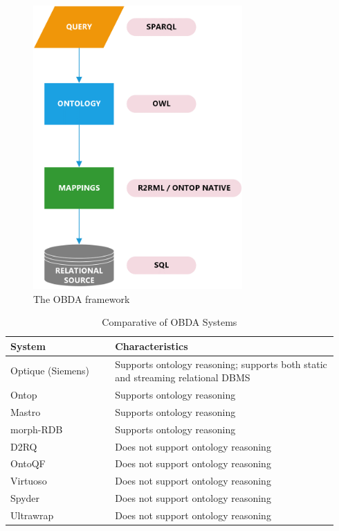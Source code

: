 \begin{figure}[ht]
    \centering
    \includegraphics[width=8cm]{res/data_integration.png}
    \caption{The \ac{OBDA} framework}
    \label{fig:obda_two}
\end{figure}


\begin{table}[ht]
    \centering
    \begin{tabular}{| p{0.3\linewidth} | p{0.64\linewidth} |}
    \hline
    \textbf{System} & \textbf{Characteristics} \\ \hline
    Optique (Siemens)  & Supports ontology reasoning; supports both static and streaming relational \ac{DBMS} \\ \hline
    Ontop  & Supports ontology reasoning \\ \hline
    Mastro  & Supports ontology reasoning \\ \hline
    morph-RDB  & Supports ontology reasoning \\ \hline
    D2RQ  & Does not support ontology reasoning \\ \hline
    OntoQF  & Does not support ontology reasoning \\ \hline
    Virtuoso  & Does not support ontology reasoning \\ \hline
    Spyder  & Does not support ontology reasoning \\ \hline
    Ultrawrap  & Does not support ontology reasoning \\ \hline
    \end{tabular}
    \caption{Comparative of \ac{OBDA} Systems \label{tab:obda_comparison}}
\end{table}

